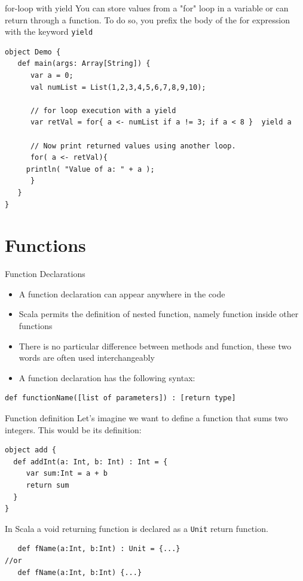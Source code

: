 \documentclass[presentation, aspectratio=169]{beamer}
\begin{document}
\begin{frame}[label={sec:org907203a},fragile]{for-loop with yield}
 You can store values from a "for" loop in a variable or can return through 
a function. To do so, you prefix the body of the for expression with the keyword \texttt{yield}

\begin{verbatim}
object Demo {
   def main(args: Array[String]) {
      var a = 0;
      val numList = List(1,2,3,4,5,6,7,8,9,10);

      // for loop execution with a yield
      var retVal = for{ a <- numList if a != 3; if a < 8 }  yield a

      // Now print returned values using another loop.
      for( a <- retVal){
	 println( "Value of a: " + a );
      }
   }
}
\end{verbatim}
\end{frame}

\section{Functions}
\label{sec:orgd5e12ac}

\begin{frame}[label={sec:org3f96581},fragile]{Function Declarations}
 \begin{itemize}
\item A function declaration can appear anywhere in the code
\item Scala permits the definition of nested function, namely function inside other functions
\item There is no particular difference between methods and function, these two words are often used
interchangeably
\item A function declaration has the following syntax:
\end{itemize}
\begin{verbatim}
def functionName([list of parameters]) : [return type] 
\end{verbatim}
\end{frame}

\begin{frame}[label={sec:org9c1c05c},fragile]{Function definition}
 Let's imagine we want to define a function  that sums two integers. 
This would be its definition:
\begin{verbatim}
object add {
  def addInt(a: Int, b: Int) : Int = {
     var sum:Int = a + b
     return sum
  }
}

\end{verbatim}

In Scala a void returning function is declared as a \texttt{Unit} return function.
\begin{verbatim}
   def fName(a:Int, b:Int) : Unit = {...}
//or
   def fName(a:Int, b:Int) {...}
\end{verbatim}
\end{frame}
\end{document}
